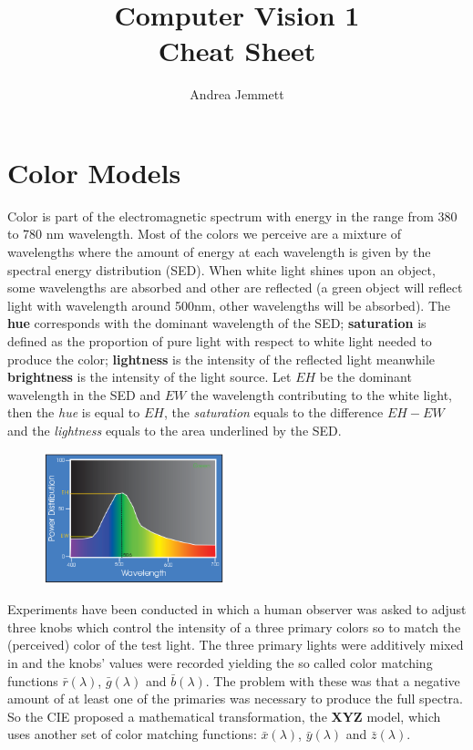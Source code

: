 \documentclass[a4paper,twocolumn]{article}
\title{Computer Vision 1 \\ Cheat Sheet}
\author{Andrea Jemmett}
\begin{document}
\maketitle

\section{Color Models}
Color is part of the electromagnetic spectrum with energy in the range from 380
to 780 nm wavelength. Most of the colors we perceive are a mixture of
wavelengths where the amount of energy at each wavelength is given by the
spectral energy distribution (SED). When white light shines upon an object, some
wavelengths are absorbed and other are reflected (a green object will reflect
light with wavelength around 500nm, other wavelengths will be absorbed). The
\textbf{hue} corresponds with the dominant wavelength of the SED;
\textbf{saturation} is defined as the proportion of pure light with respect to
white light needed to produce the color; \textbf{lightness} is the intensity of
the reflected light meanwhile \textbf{brightness} is the intensity of the light
source. Let $EH$ be the dominant wavelength in the SED and $EW$ the wavelength
contributing to the white light, then the \textit{hue} is equal to $EH$, the
\textit{saturation} equals to the difference $EH - EW$ and the
\textit{lightness} equals to the area underlined by the SED.

\begin{figure}[htpb]
	\centering
	\includegraphics[height=1.5in]{imgs/color-sed.png}
\end{figure}

Experiments have been conducted in which a human observer was asked to adjust
three knobs which control the intensity of a three primary colors so to match
the (perceived) color of the test light. The three primary lights were
additively mixed in and the knobs' values were recorded yielding the so called
color matching functions $\bar{r}(\lambda)$, $\bar{g}(\lambda)$ and
$\bar{b}(\lambda)$. The problem with these was that a negative amount of
at least one of the primaries was necessary to produce the full spectra. So the
CIE proposed a mathematical transformation, the \textbf{XYZ} model, which uses
another set of color matching functions: $\bar{x}(\lambda)$, $\bar{y}(\lambda)$
and $\bar{z}(\lambda)$.
\end{document}
